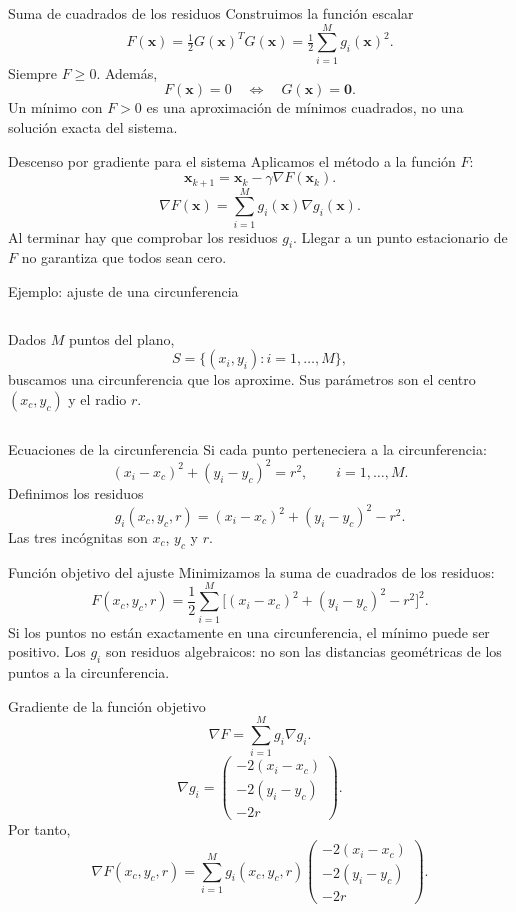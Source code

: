 \documentclass[main.tex]{subfiles}
\begin{document}
\begin{frame}[t]{Suma de cuadrados de los residuos}
Construimos la función escalar
\[\boxed{F(\boldsymbol{x})=\tfrac12G(\boldsymbol{x})^TG(\boldsymbol{x})
=\tfrac12\sum_{i=1}^M g_i(\boldsymbol{x})^2}.\]
Siempre $F\ge0$. Además,
\[F(\boldsymbol{x})=0\quad\Longleftrightarrow\quad G(\boldsymbol{x})=\boldsymbol{0}.\]
Un mínimo con $F>0$ es una aproximación de mínimos cuadrados, no una solución exacta del sistema.
\end{frame}
\begin{frame}[t]{Descenso por gradiente para el sistema}
Aplicamos el método a la función $F$:
\[\boldsymbol{x}_{k+1}=\boldsymbol{x}_k-\gamma\nabla F(\boldsymbol{x}_k).\]
\[\nabla F(\boldsymbol{x})=\sum_{i=1}^M g_i(\boldsymbol{x})\nabla g_i(\boldsymbol{x}).\]
Al terminar hay que comprobar los residuos $g_i$. Llegar a un punto estacionario de $F$ no garantiza que todos sean cero.
\end{frame}
\begin{frame}[t]{Ejemplo: ajuste de una circunferencia}
\begin{columns}\small
Dados $M$ puntos del plano,
\[S=\{(x_i,y_i):i=1,\ldots,M\},\]
buscamos una circunferencia que los aproxime.
\medskip Sus parámetros son el centro $(x_c,y_c)$ y el radio $r$.
\end{columns}
\end{frame}
\begin{frame}[t]{Ecuaciones de la circunferencia}
Si cada punto perteneciera a la circunferencia:
\[(x_i-x_c)^2+(y_i-y_c)^2=r^2,\qquad i=1,\ldots,M.\]
Definimos los residuos
\[\boxed{g_i(x_c,y_c,r)=(x_i-x_c)^2+(y_i-y_c)^2-r^2}.\]
Las tres incógnitas son $x_c$, $y_c$ y $r$.
\end{frame}
\begin{frame}[t]{Función objetivo del ajuste}
\small
Minimizamos la suma de cuadrados de los residuos:
\[F(x_c,y_c,r)=\frac12\sum_{i=1}^M
\big[(x_i-x_c)^2+(y_i-y_c)^2-r^2\big]^2.\]
Si los puntos no están exactamente en una circunferencia, el mínimo puede ser positivo.
\medskip
Los $g_i$ son residuos algebraicos: no son las distancias geométricas de los puntos a la circunferencia.
\end{frame}
\begin{frame}[t]{Gradiente de la función objetivo}
\small
\[\nabla F=\sum_{i=1}^M g_i\nabla g_i.\]
\[\nabla g_i=
\begin{pmatrix}-2(x_i-x_c)\\-2(y_i-y_c)\\-2r\end{pmatrix}.\]
Por tanto,
\[\boxed{\nabla F(x_c,y_c,r)=\sum_{i=1}^M
 g_i(x_c,y_c,r)\begin{pmatrix}-2(x_i-x_c)\\-2(y_i-y_c)\\-2r\end{pmatrix}}.\]
\end{frame}
\end{document}
